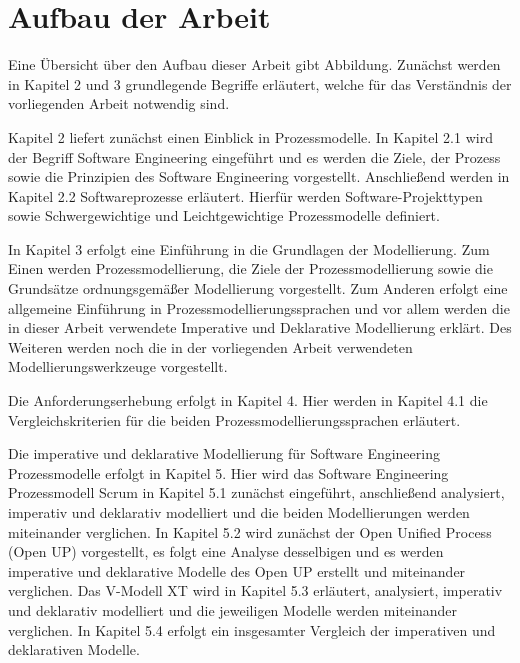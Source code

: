 \section{Aufbau der Arbeit}

Eine Übersicht über den Aufbau dieser Arbeit gibt Abbildung.
Zunächst werden in Kapitel 2 und 3 grundlegende Begriffe erläutert, welche für das Verständnis der vorliegenden Arbeit notwendig sind.\newline

Kapitel 2 liefert zunächst einen Einblick in Prozessmodelle. In Kapitel 2.1 wird der Begriff Software Engineering eingeführt und es werden die Ziele, der Prozess sowie die Prinzipien des Software Engineering vorgestellt. Anschließend werden in Kapitel 2.2 Softwareprozesse erläutert. Hierfür werden Software-Projekttypen sowie Schwergewichtige und Leichtgewichtige Prozessmodelle definiert.\newline

In Kapitel 3 erfolgt eine Einführung in die Grundlagen der Modellierung. Zum Einen werden Prozessmodellierung, die Ziele der Prozessmodellierung sowie die Grundsätze ordnungsgemäßer Modellierung vorgestellt. Zum Anderen erfolgt eine allgemeine Einführung in Prozessmodellierungssprachen und vor allem werden die in dieser Arbeit verwendete Imperative und Deklarative Modellierung erklärt. Des Weiteren werden noch die in der vorliegenden Arbeit verwendeten Modellierungswerkzeuge vorgestellt.\newline

Die Anforderungserhebung erfolgt in Kapitel 4. Hier werden in Kapitel 4.1 die Vergleichskriterien für die beiden Prozessmodellierungssprachen erläutert.\newline

Die imperative und deklarative Modellierung für Software Engineering Prozessmodelle erfolgt in Kapitel 5. Hier wird das Software Engineering Prozessmodell Scrum in Kapitel 5.1 zunächst eingeführt, anschließend analysiert, imperativ und deklarativ modelliert und die beiden Modellierungen werden miteinander verglichen. In Kapitel 5.2 wird zunächst der Open Unified Process (Open UP) vorgestellt, es folgt eine Analyse desselbigen und es werden imperative und deklarative Modelle des Open UP erstellt und miteinander verglichen. Das V-Modell XT wird in Kapitel 5.3 erläutert, analysiert, imperativ und deklarativ modelliert und die jeweiligen Modelle werden miteinander verglichen. In Kapitel 5.4 erfolgt ein insgesamter Vergleich der imperativen und deklarativen Modelle.\newline

